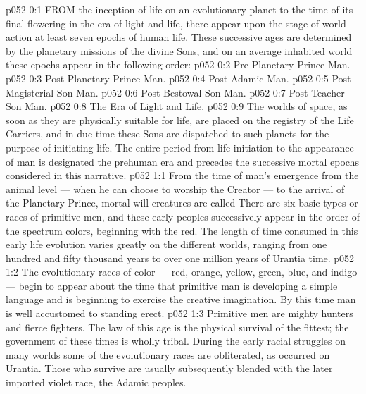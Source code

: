 \vs p052 0:1 FROM the inception of life on an evolutionary planet to the time of its final flowering in the era of light and life, there appear upon the stage of world action at least seven epochs of human life. These successive ages are determined by the planetary missions of the divine Sons, and on an average inhabited world these epochs appear in the following order:
\vs p052 0:2 \bibnobreakspace Pre\hyp{}Planetary Prince Man.
\vs p052 0:3 \bibnobreakspace Post\hyp{}Planetary Prince Man.
\vs p052 0:4 \bibnobreakspace Post\hyp{}Adamic Man.
\vs p052 0:5 \bibnobreakspace Post\hyp{}Magisterial Son Man.
\vs p052 0:6 \bibnobreakspace Post\hyp{}Bestowal Son Man.
\vs p052 0:7 \bibnobreakspace Post\hyp{}Teacher Son Man.
\vs p052 0:8 \bibnobreakspace The Era of Light and Life.
\vs p052 0:9 \pc The worlds of space, as soon as they are physically suitable for life, are placed on the registry of the Life Carriers, and in due time these Sons are dispatched to such planets for the purpose of initiating life. The entire period from life initiation to the appearance of man is designated the prehuman era and precedes the successive mortal epochs considered in this narrative.
\vs p052 1:1 From the time of man’s emergence from the animal level --- when he can choose to worship the Creator --- to the arrival of the Planetary Prince, mortal will creatures are called  There are six basic types or races of primitive men, and these early peoples successively appear in the order of the spectrum colors, beginning with the red. The length of time consumed in this early life evolution varies greatly on the different worlds, ranging from one hundred and fifty thousand years to over one million years of Urantia time.
\vs p052 1:2 The evolutionary races of color --- red, orange, yellow, green, blue, and indigo --- begin to appear about the time that primitive man is developing a simple language and is beginning to exercise the creative imagination. By this time man is well accustomed to standing erect.
\vs p052 1:3 \pc Primitive men are mighty hunters and fierce fighters. The law of this age is the physical survival of the fittest; the government of these times is wholly tribal. During the early racial struggles on many worlds some of the evolutionary races are obliterated, as occurred on Urantia. Those who survive are usually subsequently blended with the later imported violet race, the Adamic peoples.
